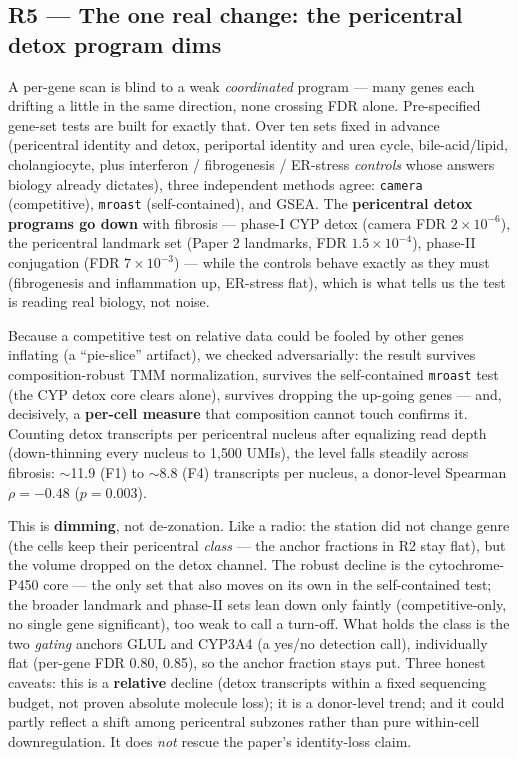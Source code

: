 \documentclass[11pt,a4paper]{article}
\begin{document}
\subsection{R5 --- The one real change: the pericentral detox program dims}
A per-gene scan is blind to a weak \emph{coordinated} program --- many genes each drifting a little in the same direction, none crossing FDR alone. Pre-specified gene-set tests are built for exactly that. Over ten sets fixed in advance (pericentral identity and detox, periportal identity and urea cycle, bile-acid/lipid, cholangiocyte, plus interferon / fibrogenesis / ER-stress \emph{controls} whose answers biology already dictates), three independent methods agree: \texttt{camera} (competitive), \texttt{mroast} (self-contained), and GSEA. The \textbf{pericentral detox programs go down} with fibrosis --- phase-I CYP detox (camera FDR $2\times10^{-6}$), the pericentral landmark set (Paper 2 landmarks, FDR $1.5\times10^{-4}$), phase-II conjugation (FDR $7\times10^{-3}$) --- while the controls behave exactly as they must (fibrogenesis and inflammation up, ER-stress flat), which is what tells us the test is reading real biology, not noise.

Because a competitive test on relative data could be fooled by other genes inflating (a ``pie-slice'' artifact), we checked adversarially: the result survives composition-robust TMM normalization, survives the self-contained \texttt{mroast} test (the CYP detox core clears alone), survives dropping the up-going genes --- and, decisively, a \textbf{per-cell measure} that composition cannot touch confirms it. Counting detox transcripts per pericentral nucleus after equalizing read depth (down-thinning every nucleus to 1{,}500 UMIs), the level falls steadily across fibrosis: $\sim$11.9 (F1) to $\sim$8.8 (F4) transcripts per nucleus, a donor-level Spearman $\rho=-0.48$ ($p=0.003$).

This is \textbf{dimming}, not de-zonation. Like a radio: the station did not change genre (the cells keep their pericentral \emph{class} --- the anchor fractions in R2 stay flat), but the volume dropped on the detox channel. The robust decline is the cytochrome-P450 core --- the only set that also moves on its own in the self-contained test; the broader landmark and phase-II sets lean down only faintly (competitive-only, no single gene significant), too weak to call a turn-off. What holds the class is the two \emph{gating} anchors GLUL and CYP3A4 (a yes/no detection call), individually flat (per-gene FDR 0.80, 0.85), so the anchor fraction stays put. Three honest caveats: this is a \textbf{relative} decline (detox transcripts within a fixed sequencing budget, not proven absolute molecule loss); it is a donor-level trend; and it could partly reflect a shift among pericentral subzones rather than pure within-cell downregulation. It does \emph{not} rescue the paper's identity-loss claim.
\end{document}
